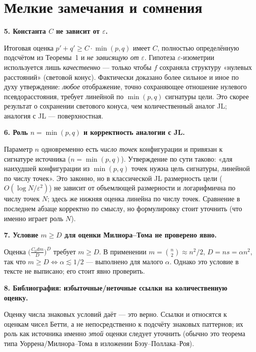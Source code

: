 \documentclass[12pt]{article}
\begin{document}
\section{Мелкие замечания и сомнения}

\begin{minbox}
\textbf{5. Константа $C$ не зависит от $\varepsilon$.}

Итоговая оценка $p'+q'\ge C\cdot\min(p,q)$ имеет $C$, полностью определённую подсчётом из Теоремы~1 и \emph{не зависящую от $\varepsilon$}. Гипотеза $\varepsilon$-изометрии используется лишь \emph{качественно} — только чтобы $f$ сохраняла структуру «нулевых расстояний» (световой конус). Фактически доказано более сильное и иное по духу утверждение: \emph{любое} отображение, точно сохраняющее отношение нулевого псевдорасстояния, требует линейной по $\min(p,q)$ сигнатуры цели. Это скорее результат о сохранении светового конуса, чем количественный аналог JL; аналогия с JL — поверхностная.
\end{minbox}

\begin{minbox}
\textbf{6. Роль $n=\min(p,q)$ и корректность аналогии с JL.}

Параметр $n$ одновременно есть \emph{число точек} конфигурации и привязан к сигнатуре источника ($n=\min(p,q)$). Утверждение по сути таково: «для наихудшей конфигурации из $\min(p,q)$ точек нужна цель сигнатуры, линейной по числу точек». Это законно, но в классической JL размерность цели ($O(\log N/\varepsilon^2)$) не зависит от объемлющей размерности и логарифмична по числу точек $N$; здесь же нижняя оценка линейна по числу точек. Сравнение в последнем абзаце корректно по смыслу, но формулировку стоит уточнить (что именно играет роль $N$).
\end{minbox}

\begin{minbox}
\textbf{7. Условие $m\ge D$ для оценки Милнора--Тома не проверено явно.}

Оценка $\bigl(\tfrac{C_0dm}{D}\bigr)^D$ требует $m\ge D$. В применении $m=\binom n2\approx n^2/2$, $D=ns=\alpha n^2$, так что $m\ge D\iff\alpha\lesssim1/2$ — выполнено для малого $\alpha$. Однако это условие в тексте не выписано; его стоит явно проверить.
\end{minbox}

\begin{minbox}
\textbf{8. Библиография: избыточные/неточные ссылки на количественную оценку.}

Оценку числа знаковых условий даёт \cite{BasuPollackRoy} — это верно. Ссылки \cite{Milnor1964} и \cite{Thom1965} относятся к оценкам чисел Бетти, а не непосредственно к подсчёту знаковых паттернов; их роль как источника именно \emph{этой} оценки следует уточнить (обычно это теорема типа Уоррена/Милнора--Тома в изложении Бэзу--Поллака--Роя).
\end{minbox}
\end{document}
